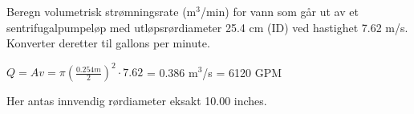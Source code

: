 

Beregn volumetrisk strømningsrate (m$^{3}$/min) for vann som går ut av et sentrifugalpumpeløp med utløpsrørdiameter 25.4 cm (ID) ved hastighet 7.62 m/s. Konverter deretter til gallons per minute.







$Q=Av=\pi(\frac{0.254m}{2})^2\cdot 7.62$ = 0.386 m$^{3}$/s = 6120 GPM







Her antas innvendig rørdiameter eksakt 10.00 inches.


